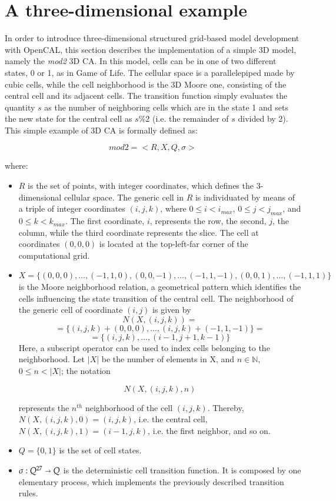 \section{A three-dimensional example}\label{sec:mod2}

In order to introduce three-dimensional structured grid-based model
development with OpenCAL, this section describes the implementation of
a simple 3D model, namely the \emph{mod2} 3D CA. In this model, cells
can be in one of two different states, 0 or 1, as in Game of Life. The
cellular space is a parallelepiped made by cubic cells, while the cell
neighborhood is the 3D Moore one, consisting of the central cell and
its adjacent cells. The transition function simply evaluates the
quantity $s$ as the number of neighboring cells which are in the state
1 and sets the new state for the central cell as $s\%2$ (i.e. the
remainder of $s$ divided by 2). This simple example of 3D CA is
formally defined as:

$$mod2 = < R, X, Q, \sigma >$$

where:

\begin{itemize}

\item $R$ is the set of points, with integer coordinates, which
  defines the 3-dimensional cellular space. The generic cell in $R$ is
  individuated by means of a triple of integer coordinates $(i, j,
  k)$, where $0 \leq i < i_{max}$, $0 \leq j < j_{max}$, and $0 \leq k
  < k_{max}$. The first coordinate, $i$, represents the row, the
  second, $j$, the column, while the third coordinate represents the
  slice. The cell at coordinates $(0,0,0)$ is located at the
  top-left-far corner of the computational grid.

\item $X = \{(0,0,0), \dots, (-1,1,0), (0,0,-1), \dots, (-1,1,-1),
  (0,0,1), \dots, (-1,1,1)\}$ is the Moore neighborhood
  relation, a geometrical pattern which identifies the cells
  influencing the state transition of the central cell. The
  neighborhood of the generic cell of coordinate $(i, j)$ is given by
  $$N(X, (i, j, k)) = $$
  $$= \{(i, j, k)+(0,0,0), \dots, (i, j, k)+(-1,1,-1)\} =$$
  $$= \{(i, j, k), \dots, (i-1,j+1,k-1)\}$$
  Here, a subscript operator can be used to index cells belonging to the
  neighborhood. Let $|X|$ be the number of elements in X, and $n \in
  \mathbb{N}$, $0 \leq n < |X|$; the notation

  $$N(X, (i, j, k), n)$$

  represents the $n^{th}$ neighborhood of the cell $(i,j,k)$. Thereby,
  $N(X, (i, j, k), 0) = (i, j, k)$, i.e. the central cell, $N(X, (i, j, k), 1)
  = (i-1, j, k)$, i.e. the first neighbor, and so on.

\item $Q = \{0, 1\}$ is the set of cell states.

\item $\sigma : Q^{27} \shortrightarrow Q$ is the deterministic cell
  transition function. It is composed by one elementary process, which
  implements the previously described transition rules.
\end{itemize}


